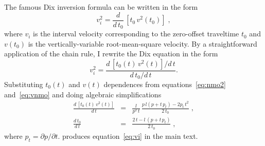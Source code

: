 The famous Dix inversion formula \cite[]{GEO20-01-00680086} can be
written in the form
\begin{equation}
  \label{eq:dix}
  v_i^2 = \frac{d}{d\,t_0}\,\left[t_0\,v^2(t_0)\right]\;,
\end{equation}
where $v_i$ is the interval velocity corresponding to the zero-offset
traveltime $t_0$ and $v(t_0)$ is the vertically-variable
root-mean-square velocity. By a straightforward application of the
chain rule, I rewrite the Dix equation in the form
\begin{equation}
  \label{eq:dix}
  v_i^2 = \frac{d\,\left[t_0(t)\,v^2(t)\right]/d\,t}
  {d\,t_0/d\,t}.
\end{equation}
Substituting $t_0(t)$ and $v(t)$ dependences from
equations~\ref{eq:nmo2} and~\ref{eq:vnmo} and doing algebraic
simplifications 
\begin{eqnarray}
  \label{eq:dvdt}
  \frac{d\,\left[t_0(t)\,v^2(t)\right]}{d\,t} & = & \frac{l}{p^2\,t}\,
  \frac{p\,l (p + t\,p_t) - 2 p_t\,t^2}{2\,t_0}\;, \\
  \label{eq:dt0dt}
  \frac{d\,t_0}{d\,t} & = & \frac{2\,t - l\,(p + t\,p_t)}{2\,t_0}\;,
\end{eqnarray}
where $p_t = \partial p/\partial t$.
produces equation~\ref{eq:vi} in the main text.




